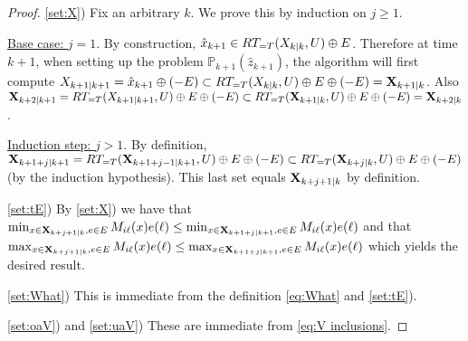 \begin{proof}
	
\ref{set:X}) 
Fix an arbitrary $k$. We prove this by induction on $j \geq 1$.

\underline{Base case: $j=1$}. By construction, $\hat{x}_{k+1} \in RT_{=T}(X_{k|k},U) \oplus E$.
Therefore at time $k+1$, when setting up the problem $\mathbb{P}_{k+1}(\hat{z}_{k+1})$, the algorithm will first compute
$X_{k+1|k+1} = \hat{x}_{k+1} \oplus (-E)  \subset RT_{=T}(X_{k|k},U) \oplus E \oplus (-E) = \mathbf{X}_{k+1|k}$.
Also 
$\mathbf{X}_{k+2|k+1} = RT_{=T}(X_{k+1|k+1},U) \oplus E \oplus(-E) \subset  RT_{=T}(\mathbf{X}_{k+1|k},U) \oplus E \oplus(-E) = \mathbf{X}_{k+2|k}$.

\underline{Induction step: $j > 1$}.
By definition, $\mathbf{X}_{k+1+j|k+1} = RT_{=T}(\mathbf{X}_{k+1+j-1|k+1},U) \oplus E \oplus (-E) \subset  RT_{=T}(\mathbf{X}_{k+j|k},U) \oplus E \oplus (-E)$ (by the induction hypothesis). This last set equals $\mathbf{X}_{k+j+1|k}$ by definition.

\ref{set:tE}) 	By \ref{set:X}) 
 we have that 
 $ \min_{x \in \mathbf{X}_{k+j+1|k}, e \in E} M_{i\ell}(x)e(\ell) \leq \min_{x \in \mathbf{X}_{k+1+j|k+1}, e \in E} M_{i\ell}(x)e(\ell)$ and that 
 $\max_{x \in \mathbf{X}_{k+j+1|k}, e \in E} M_{i\ell}(x)e(\ell) \leq \max_{x \in \mathbf{X}_{k+1+j|k+1}, e \in E} M_{i\ell}(x)e(\ell)$
 which yields the desired result.
 
 \ref{set:What}) This is immediate from the definition \eqref{eq:What} and \ref{set:tE}).
 
 \ref{set:oaV}) and \ref{set:uaV}) These are immediate from \eqref{eq:V inclusions}.
 
	\end{proof}
